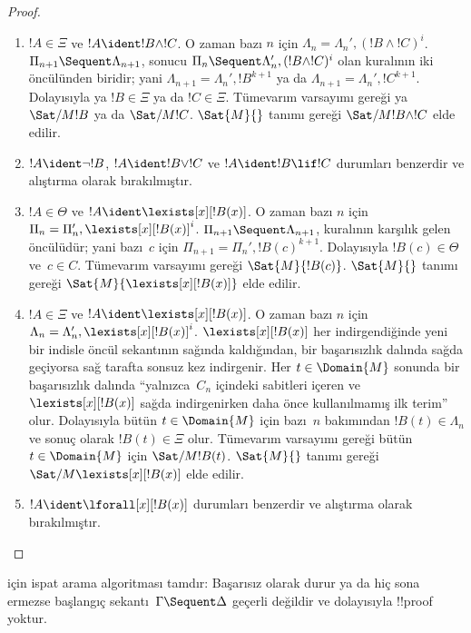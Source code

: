 \documentclass[../../../include/open-logic-section]{subfiles}
\begin{document}
\begin{proof}
\begin{enumerate}
  \item $!A \in \Xi$ ve $!A \ident !B \land !C$. O zaman bazı $n$ için
  $\Lambda_n = \Lambda_n', (!B \land !C)^i$. $\Pi_{n+1} \Sequent
  \Lambda_{n+1}$, sonucu $\Pi_n \Sequent \Lambda'_n, (!B \land !C)^i$ olan
  \RightR{\land} kuralının iki öncülünden biridir; yani $\Lambda_{n+1} =
  \Lambda_n', !B^{k+1}$ ya da $\Lambda_{n+1} = \Lambda_n', !C^{k+1}$.
  Dolayısıyla ya $!B \in \Xi$ ya da $!C \in \Xi$. Tümevarım varsayımı
  gereği ya $\Sat/{M}{!B}$ ya da $\Sat/{M}{!C}$. $\Sat{M}{}$ tanımı gereği
  $\Sat/{M}{!B \land !C}$ elde edilir.

  \item $!A \ident \lnot !B$, $!A \ident !B \lor !C$ ve $!A \ident !B
  \lif !C$ durumları benzerdir ve alıştırma olarak bırakılmıştır.

  \item $!A \in \Theta$ ve $!A \ident \lexists[x][!B(x)]$. O zaman bazı
  $n$ için $\Pi_n = \Pi_n', \lexists[x][!B(x)]^i$. $\Pi_{n+1} \Sequent
  \Lambda_{n+1}$, \LeftR{\lexists} kuralının karşılık gelen öncülüdür;
  yani bazı~$c$ için $\Pi_{n+1} = \Pi_n', !B(c)^{k+1}$. Dolayısıyla
  $!B(c) \in \Theta$ ve~$c \in C$. Tümevarım varsayımı gereği
  $\Sat{M}{!B(c)}$. $\Sat{M}{}$ tanımı gereği
  $\Sat{M}{\lexists[x][!B(x)]}$ elde edilir.

  \item $!A \in \Xi$ ve $!A \ident \lexists[x][!B(x)]$. O zaman bazı $n$
  için $\Lambda_n = \Lambda_n', \lexists[x][!B(x)]^i$. $\lexists[x][!B(x)]$
  her indirgendiğinde yeni bir indisle öncül sekantının sağında kaldığından,
  bir başarısızlık dalında sağda geçiyorsa sağ tarafta sonsuz kez indirgenir.
  Her $t \in \Domain{M}$ sonunda bir başarısızlık dalında ``yalnızca~$C_n$
  içindeki sabitleri içeren ve $\lexists[x][!B(x)]$ sağda indirgenirken daha
  önce kullanılmamış ilk terim'' olur. Dolayısıyla bütün $t \in \Domain{M}$
  için bazı~$n$ bakımından $!B(t) \in \Lambda_n$ ve sonuç olarak $!B(t) \in
  \Xi$ olur. Tümevarım varsayımı gereği bütün $t \in \Domain{M}$ için
  $\Sat/{M}{!B(t)}$. $\Sat{M}{}$ tanımı gereği
  $\Sat/{M}{\lexists[x][!B(x)]}$ elde edilir.

  \item $!A \ident \lforall[x][!B(x)]$ durumları benzerdir ve alıştırma
  olarak bırakılmıştır.
\end{enumerate}
\end{proof}

\begin{cor}  için ispat arama algoritması
tamdır: Başarısız olarak durur ya da hiç sona ermezse başlangıç
sekantı~$\Gamma \Sequent \Delta$ geçerli değildir ve dolayısıyla !!{proof}
yoktur.
\end{cor}
\end{document}

